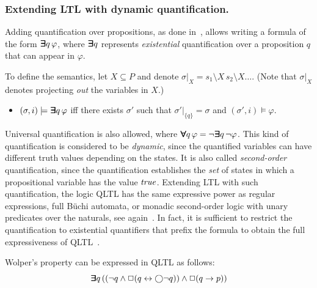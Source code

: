 \subsubsection{Extending LTL with dynamic quantification.}
Adding quantification over propositions, as done in~\cite{Wolper}, allows writing a formula of the form
$\bm{\exists}\kern-0.6em\bm{\exists} q \, \varphi$, where
$\bm{\exists}\kern-0.6em\bm{\exists} q$ represents {\em existential} quantification over a proposition $q$ that can appear in $\varphi$.

To define the semantics, let $X \subseteq P$ 
and denote $\sigma |_X = s_1 \setminus X \, s_2 \setminus X \ldots$. (Note that $\sigma |_X$ denotes projecting {\em out} the variables in $X$.)



\begin{itemize}
\item $( \sigma, i ) \models \boldsymbol{\bm{\exists}\kern-0.6em\bm{\exists}} q \, \varphi$ iff there exists
$\sigma'$ such that $\sigma' |_{\{ q \} } = \sigma$ and 
$( \sigma', i) \models \varphi$.
\end{itemize}
%
%
Universal quantification is also allowed, where $\bm{\forall}\kern-0.6em\bm{\forall} q\, \varphi =
\neg \bm{\exists}\kern-0.6em\bm{\exists} q\, \neg \varphi$.
This kind of quantification is considered to be {\em dynamic}, since the quantified variables can have different truth values depending on the states. It is also called  {\em second-order} quantification, since the quantification establishes the {\em set} of states in which a propositional variable has the value $\mathit{true}$.
Extending LTL with such quantification, the logic QLTL has the same expressive power as regular expressions, full B\"{u}chi
automata, or monadic second-order logic with unary predicates over the naturals, see again~\cite{Thomas}.
In fact, it is sufficient to restrict the quantification to existential quantifiers that prefix the formula to obtain the full expressiveness of QLTL~\cite{Thomas}. 

Wolper's property can be expressed in QLTL as follows:
\begin{equation} \label{form0} \bm{\exists}\kern-0.6em\bm{\exists} q \,
( (  \neg q \wedge \Box (q \leftrightarrow \bigcirc \neg q )  )  \wedge \Box (q \rightarrow p ) )\end{equation}

